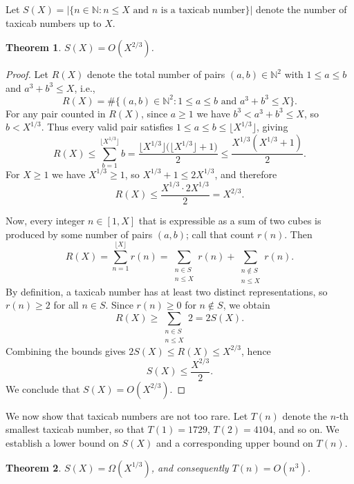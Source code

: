 \documentclass[12pt]{amsart}
\newtheorem{theorem}{Theorem}
\theoremstyle{definition}
\theoremstyle{remark}
\begin{document}
Let $S(X) = |\{n \in \mathbb{N} : n \le X \text{ and } n \text{ is a taxicab number}\}|$ denote the number of taxicab numbers up to $X$.

\begin{theorem}\label{thm:density}
  $S(X) = O(X^{2/3})$.
\end{theorem}

\begin{proof}
Let $R(X)$ denote the total number of pairs $(a, b) \in \mathbb{N}^2$ with $1 \le a \le b$ and $a^3 + b^3 \le X$, i.e.,
\[
  R(X) = \#\bigl\{(a,b) \in \mathbb{N}^2 : 1 \le a \le b \text{ and } a^3 + b^3 \le X\bigr\}.
\]
For any pair counted in $R(X)$, since $a \ge 1$ we have $b^3 < a^3 + b^3 \le X$, so $b < X^{1/3}$. Thus every valid pair satisfies $1 \le a \le b \le \lfloor X^{1/3} \rfloor$, giving
\[
  R(X) \le \sum_{b=1}^{\lfloor X^{1/3} \rfloor} b = \frac{\lfloor X^{1/3} \rfloor\bigl(\lfloor X^{1/3} \rfloor + 1\bigr)}{2} \le \frac{X^{1/3}(X^{1/3} + 1)}{2}.
\]
For $X \ge 1$ we have $X^{1/3} \ge 1$, so $X^{1/3} + 1 \le 2X^{1/3}$, and therefore
\[
  R(X) \le \frac{X^{1/3} \cdot 2X^{1/3}}{2} = X^{2/3}.
\]

Now, every integer $n \in [1, X]$ that is expressible as a sum of two cubes is produced by some number of pairs $(a,b)$; call that count $r(n)$. Then
\[
  R(X) = \sum_{n=1}^{\lfloor X \rfloor} r(n) = \sum_{\substack{n \in S \\ n \le X}} r(n) + \sum_{\substack{n \notin S \\ n \le X}} r(n).
\]
By definition, a taxicab number has at least two distinct representations, so $r(n) \ge 2$ for all $n \in S$. Since $r(n) \ge 0$ for $n \notin S$, we obtain
\[
  R(X) \ge \sum_{\substack{n \in S \\ n \le X}} 2 = 2S(X).
\]
Combining the bounds gives $2S(X) \le R(X) \le X^{2/3}$, hence
\[
  S(X) \le \frac{X^{2/3}}{2}.
\]
We conclude that $S(X) = O(X^{2/3})$.
\end{proof}

We now show that taxicab numbers are not too rare. Let $T(n)$ denote the $n$-th smallest taxicab number, so that $T(1) = 1729$, $T(2) = 4104$, and so on. We establish a lower bound on $S(X)$ and a corresponding upper bound on $T(n)$.

\begin{theorem}\label{thm:growth}
  $S(X) = \Omega(X^{1/3})$, and consequently $T(n) = O(n^3)$.
\end{theorem}
\end{document}
